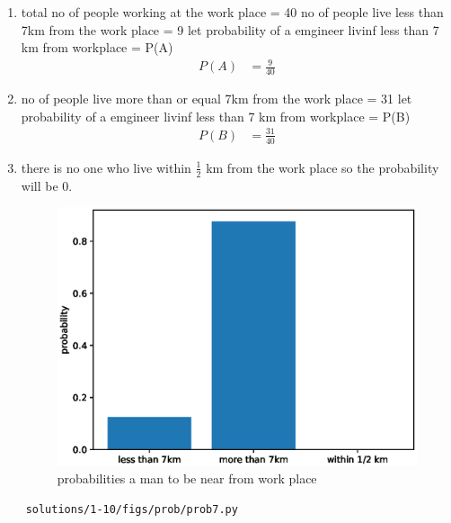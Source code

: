 \begin{enumerate}
\item total no of people working at the work place = 40
no of people live less than 7km from the work place = 9
let probability of a emgineer livinf less than 7 km from workplace = P(A)
\begin{align}
P\left(A\right)&=\frac{9}{40}
\end{align}
\item no of people live more  than or equal 7km from the work place = 31
let probability of a emgineer livinf less than 7 km from workplace = P(B)
\begin{align}
P\left(B\right)&=\frac{31}{40}
\end{align}
\item there is no one who live within $\frac{1}{2}$ km from the work place so the probability will be 0.
\begin{figure}[!ht]
	\centering
	\includegraphics[width=\columnwidth]{./solutions/1-10/figures/prob/prob7.eps}
	\caption{probabilities a man to be near from work place}
	\label{fig:bt7}
\end{figure}
\end{enumerate}
	\begin{lstlisting}
	solutions/1-10/figs/prob/prob7.py
	\end{lstlisting}
